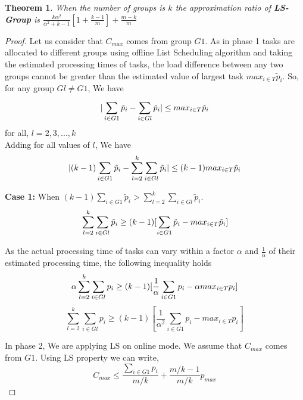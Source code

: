 \documentclass[10pt, conference, compsocconf]{IEEEtran}
\newtheorem{theorem}{Theorem}[section]
\begin{document}
\begin{theorem}
  When the number of groups is $k$ the approximation ratio of
  \textbf{LS-Group } is $ \frac{k\alpha^{2}}{\alpha^{2}+k-1}[1+
  {\frac{k-1}{m}} ]+ {\frac{m-k}{m}}$
\end{theorem}
\begin{proof} 
  Let us consider that $ C_{max}$ comes from group $G1$.  As in phase
  1 tasks are allocated to different groups using offline List
  Scheduling algorithm and taking the estimated processing times of
  tasks, the load difference between any two groups cannot be greater
  than the estimated value of largest task ${max_{i \in T}}{\tilde
    p_{i}}$.  So, for any group $Gl \neq G1$, We have
  \begin{equation}{\nonumber}
    |\sum_{i \in G1 }^{}{\tilde p_{i}}- \sum_{i \in Gl }^{}{\tilde p_{i}}| \leq {max_{i \in T}}{\tilde p_{i}}\end{equation}  \hspace*{15pt}   for all, $l = 2,3,...,k$ \\ 
  Adding for all values of $l$, We have 
  \begin{equation}{\nonumber}
    |(k-1)\sum_{i \in G1 }^{}{\tilde p_{i}}- \sum_{l=2}^{k}\sum_{i \in Gl }^{}{\tilde p_{i}}| \leq (k-1) {max_{i \in T}}{\tilde p_{i}}
  \end{equation}

  \textbf{Case 1:} When $(k-1)\sum_{i \in G1 }^{}{\tilde p_{i}} >
  \sum_{l=2}^{k}\sum_{i \in Gl }^{}{\tilde p_{i}}$.
  \begin{equation}{\nonumber}
    \sum_{l=2}^{k}\sum_{i \in Gl }^{}{\tilde p_{i}} \geq (k-1)[\sum_{i \in G1 }^{}{\tilde p_{i}}- {max_{i \in T}}{\tilde p_{i}}]
  \end{equation}

  As the actual processing time of tasks can vary within a factor
  $\alpha$ and $\frac{1}{\alpha}$ of their estimated processing time,
  the following inequality holds
  \begin{equation}{\nonumber}
    \alpha\sum_{l=2}^{k}\sum_{i \in Gl }^{}{{p_{i}}} \geq (k-1)[\frac{1}{\alpha}\sum_{i \in G1 }^{}{{p_{i}}}- \alpha {max_{i \in T}}{{p_{i}}}]
  \end{equation}
  \begin{equation}\label{eq9}
    \sum_{l=2}^{k}\sum_{i \in Gl }^{}{{p_{i}}} \geq (k-1)[\frac{1}{\alpha^{2}}\sum_{i \in G1 }^{}{{p_{i}}}-  {max_{i \in T}}{{p_{i}}}]
  \end{equation}

  In phase 2, We are applying LS on online mode. We assume that
  $C_{max}$ comes from $G1$. Using LS property we can write,
  \begin{equation}\label{eq10}
    C_{max} \leq \frac{\sum_{i \in G1 }^{}{{p_{i}}}}{m/k} + {\frac{m/k-1}{m/k}} p_{max}
  \end{equation}


\end{proof}
\end{document}
